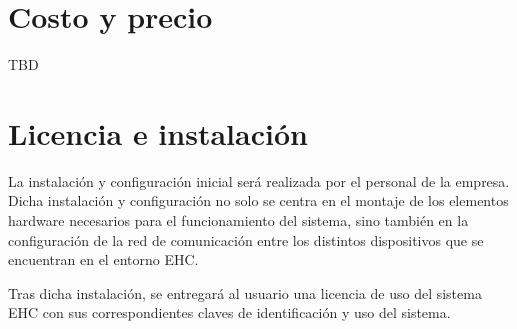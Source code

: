 \section{Costo y precio}
    TBD

\section{Licencia e instalación}
    La instalación y configuración inicial será realizada por el personal de la empresa. Dicha instalación y configuración no solo se centra en el montaje de los elementos hardware necesarios para el funcionamiento del sistema, sino también en la configuración de la red de comunicación entre los distintos dispositivos que se encuentran en el entorno EHC. \par

    Tras dicha instalación, se entregará al usuario una licencia de uso del sistema EHC con sus correspondientes claves de identificación y uso del sistema.
